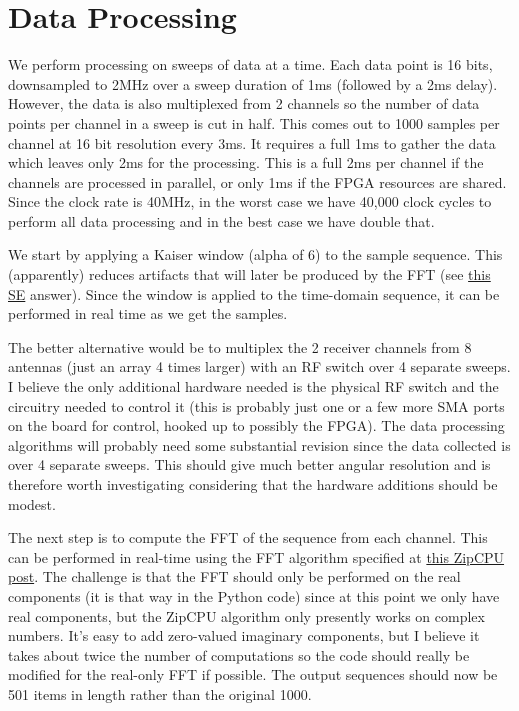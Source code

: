 \chapter{Data Processing}
\label{cha:data-processing}

We perform processing on sweeps of data at a time. Each data point is 16 bits, downsampled to 2MHz
over a sweep duration of 1ms (followed by a 2ms delay). However, the data is also multiplexed from 2
channels so the number of data points per channel in a sweep is cut in half. This comes out to 1000
samples per channel at 16 bit resolution every 3ms. It requires a full 1ms to gather the data which
leaves only 2ms for the processing. This is a full 2ms per channel if the channels are processed in
parallel, or only 1ms if the FPGA resources are shared. Since the clock rate is 40MHz, in the worst
case we have 40,000 clock cycles to perform all data processing and in the best case we have double
that.

We start by applying a Kaiser window (alpha of 6) to the sample sequence. This (apparently) reduces
artifacts that will later be produced by the FFT (see
\href{https://dsp.stackexchange.com/a/14071/37547}{this SE} answer).  Since the window is applied to
the time-domain sequence, it can be performed in real time as we get the samples.

The better alternative would be to multiplex the 2 receiver channels from 8 antennas (just an array
4 times larger) with an RF switch over 4 separate sweeps. I believe the only additional hardware
needed is the physical RF switch and the circuitry needed to control it (this is probably just one
or a few more SMA ports on the board for control, hooked up to possibly the FPGA). The data
processing algorithms will probably need some substantial revision since the data collected is over
4 separate sweeps. This should give much better angular resolution  and
is therefore worth investigating considering that the hardware additions should be modest.

The next step is to compute the FFT of the sequence from each channel. This can be performed in
real-time using the FFT algorithm specified at
\href{https://zipcpu.com/dsp/2018/10/02/fft.html}{this ZipCPU post}. The challenge is that the FFT
should only be performed on the real components (it is that way in the Python code) since at this
point we only have real components, but the ZipCPU algorithm only presently works on complex
numbers. It's easy to add zero-valued imaginary components, but I believe it takes about twice the
number of computations so the code should really be modified for the real-only FFT if possible. The
output sequences should now be 501 items in length rather than the original 1000.


